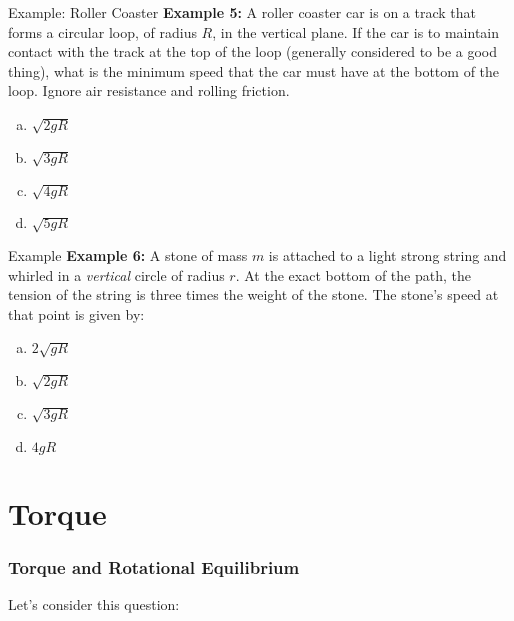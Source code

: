 \documentclass[12pt,compress,aspectratio=169]{beamer}
\begin{document}
\begin{frame}{Example: Roller Coaster}
  \textbf{Example 5:} A roller coaster car is on a track that forms a circular
  loop, of radius $R$, in the vertical plane. If the car is to maintain contact
  with the track at the top of the loop (generally considered to be a good
  thing), what is the minimum speed that the car must have at the bottom of the
  loop. Ignore air resistance and rolling friction.
  \begin{enumerate}[(a)]
  \item $\sqrt{2gR}$
  \item $\sqrt{3gR}$
  \item $\sqrt{4gR}$
  \item $\sqrt{5gR}$
  \end{enumerate}
\end{frame}


\begin{frame}{Example}
  \textbf{Example 6:} A stone of mass $m$ is attached to a light strong string
  and whirled in a \emph{vertical} circle of radius $r$. At the exact bottom of
  the path, the tension of the string is three times the weight of the stone.
  The stone's speed at that point is given by:
  \begin{enumerate}[(a)]
  \item $2\sqrt{gR}$
  \item $\sqrt{2gR}$
  \item $\sqrt{3gR}$
  \item $4gR$
  \end{enumerate}
\end{frame}


\section{Torque}


\begin{frame}
  \frametitle{Torque and Rotational Equilibrium}
  Let's consider this question:

  \begin{center}
  \end{center}
\end{frame}
\end{document}
